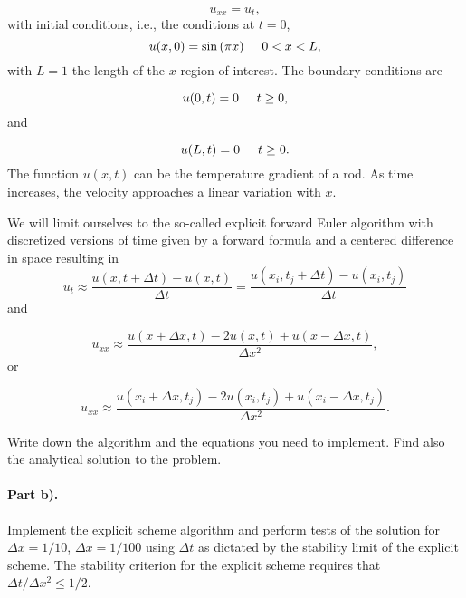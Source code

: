 \documentclass[%
oneside,                 %
final,                   %
10pt]{article}
\begin{document}
\begin{equation*}
u_{xx} = u_t,
\end{equation*}
with initial conditions, i.e., the conditions at $t=0$,
\begin{equation*}
u(x,0)= \sin{(\pi x)} \hspace{0.5cm} 0 < x < L,
\end{equation*}
with $L=1$ the length of the $x$-region of interest. The 
boundary conditions are

\begin{equation*}
u(0,t)= 0 \hspace{0.5cm} t \ge 0,
\end{equation*}
and

\begin{equation*}
u(L,t)= 0 \hspace{0.5cm} t \ge 0.
\end{equation*}
The function $u(x,t)$  can be the temperature gradient of a  rod.
As time increases, the velocity approaches a linear variation with $x$. 

We will limit ourselves to the so-called explicit forward Euler algorithm with discretized versions of time given by a forward formula and a centered difference in space resulting in   
\begin{equation*} 
u_t\approx \frac{u(x,t+\Delta t)-u(x,t)}{\Delta t}=\frac{u(x_i,t_j+\Delta t)-u(x_i,t_j)}{\Delta t}
\end{equation*}
and

\begin{equation*}
u_{xx}\approx \frac{u(x+\Delta x,t)-2u(x,t)+u(x-\Delta x,t)}{\Delta x^2},
\end{equation*}
or

\begin{equation*}
u_{xx}\approx \frac{u(x_i+\Delta x,t_j)-2u(x_i,t_j)+u(x_i-\Delta x,t_j)}{\Delta x^2}.
\end{equation*}

Write down the algorithm and the equations you need to implement.
Find also the analytical solution to the problem. 

\paragraph{Part b).}
Implement the explicit scheme  algorithm and perform tests of the solution 
for $\Delta x=1/10$, $\Delta x=1/100$ using  $\Delta t$ as dictated by the stability limit of the explicit scheme. The stability criterion for the explicit scheme requires that $\Delta t/\Delta x^2 \leq 1/2$. 
\end{document}
